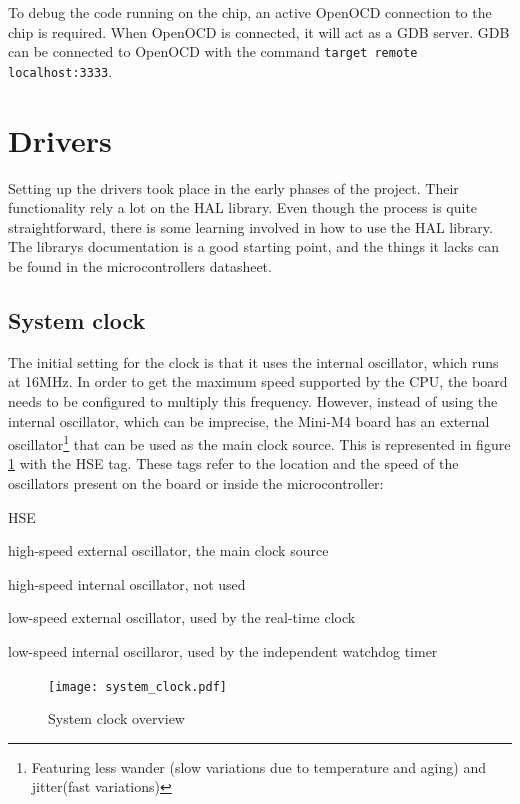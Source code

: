 To debug the code running on the chip, an active OpenOCD connection to the chip
is required. When OpenOCD is connected, it will act as a GDB server. GDB can
be connected to OpenOCD with the command \texttt{target remote localhost:3333}.

\section{Drivers}

Setting up the drivers took place in the early phases of the project. Their
functionality rely a lot on the HAL library. Even though the process is
quite straightforward, there is some learning involved in how to use the
HAL library. The library\textquotesingle s documentation is a good starting
point, and the things it lacks can be found in the 
microcontroller\textquotesingle s datasheet.

\subsection{System clock}
The initial setting for the clock is that it uses the internal oscillator,
which runs at 16MHz. In order to get the maximum speed supported by the
CPU, the board needs to be configured to multiply this frequency.
However, instead of using the internal oscillator, which can be imprecise, 
the Mini-M4 
board has an external oscillator\footnote{Featuring less wander (slow
 variations due to temperature and aging) and jitter(fast variations)} 
that can be used as the main clock 
source. This is represented in figure \ref{fig:system_clock} with the HSE
tag. These tags refer to the location and the speed of the oscillators
present on the board or inside the microcontroller:

\begin{labeling}{HSE}
	\item[\textbf{HSE}]
		high-speed external oscillator, the main clock source
	\item[\textbf{HSI}]
		high-speed internal oscillator, not used
	\item[\textbf{LSE}]
		low-speed external oscillator, used by the real-time clock
	\item[\textbf{LSI}]
		low-speed internal oscillaror, used by the independent watchdog
		timer
\end{labeling}

\begin{figure}[H]
\centering
\texttt{[image: system\_clock.pdf]}
\caption{System clock overview \cite{reference_manual_74}}
\label{fig:system_clock}
\end{figure}

